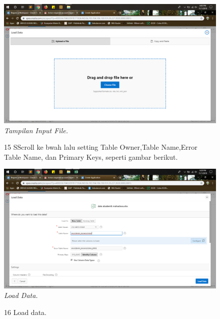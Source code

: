 \begin{enumerate}
\begin{figure}
    \begin{center}
\includegraphics[scale=0.2]{figures/g12.png}
    \caption{\textit{Tampilan Input File.}}
        \end{center}
\label{gambar}
\end{figure}

\begin{figure}
\item[15] SScroll ke bwah lalu setting Table Owner,Table Name,Error Table Name, dan Primary Keys, seperti gambar berikut.

    \begin{center}
\includegraphics[scale=0.2]{figures/g13.png}
    \caption{\textit{Load Data.}}
        \end{center}
\label{gambar}
\end{figure}

\begin{figure}
\item[16] Load data.


\end{figure}
\end{enumerate}
